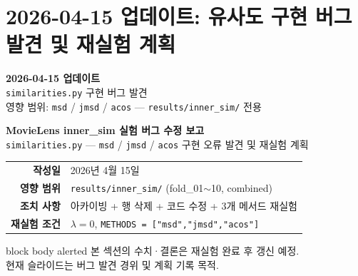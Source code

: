 \documentclass[aspectratio=169,10pt]{beamer}
\begin{document}
\section{2026-04-15 업데이트: 유사도 구현 버그 발견 및 재실험 계획}

\begin{frame}[plain]
	\begin{center}
		\vspace{1.8cm}
		{\LARGE \textbf{2026-04-15 업데이트}}\\[0.8em]
		{\large \texttt{similarities.py} 구현 버그 발견}\\[0.6em]
		{\normalsize 영향 범위: \texttt{msd} / \texttt{jmsd} / \texttt{acos} --- \texttt{results/inner\_sim/} 전용}
	\end{center}
\end{frame}

\begin{frame}
	\begin{center}
		\vspace{0.8cm}
		{\Large \textbf{MovieLens inner\_sim 실험 버그 수정 보고}}\\[1.0em]
		{\large \texttt{similarities.py} --- \texttt{msd} / \texttt{jmsd} / \texttt{acos} 구현 오류 발견 및 재실험 계획}\\[1.5em]
		\begin{tabular}{rl}
			\textbf{작성일}   & 2026년 4월 15일 \\[0.3em]
			\textbf{영향 범위} & \texttt{results/inner\_sim/} (fold\_01$\sim$10, combined) \\[0.3em]
			\textbf{조치 사항} & 아카이빙 + 행 삭제 + 코드 수정 + 3개 메서드 재실험 \\[0.3em]
			\textbf{재실험 조건} & $\lambda = 0$, \texttt{METHODS = ["msd","jmsd","acos"]} \\
		\end{tabular}
		\vspace{1.2em}

		\begin{beamercolorbox}[rounded=true,shadow=true,wd=0.85\textwidth]{block body alerted}
			\centering
			\small 본 섹션의 수치·결론은 재실험 완료 후 갱신 예정.\\
			현재 슬라이드는 버그 발견 경위 및 계획 기록 목적.
		\end{beamercolorbox}
	\end{center}
\end{frame}
\end{document}
